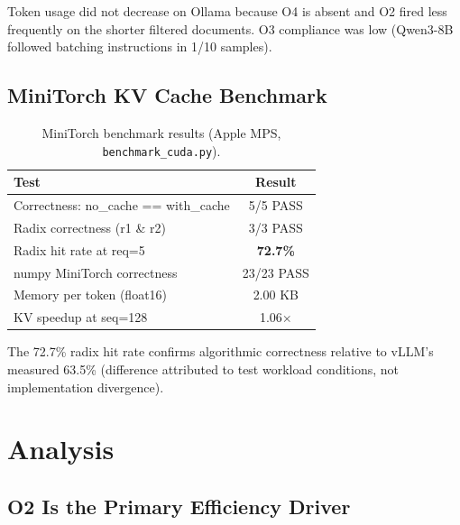 \documentclass{article}
\begin{document}
Token usage did not decrease on Ollama because O4 is absent and O2 fired less frequently on the shorter filtered documents. O3 compliance was low (Qwen3-8B followed batching instructions in 1/10 samples).

\subsection{MiniTorch KV Cache Benchmark}

\begin{table}[t]
\caption{MiniTorch benchmark results (Apple MPS, \texttt{benchmark\_cuda.py}).}
\label{tab:minitorch}
\vskip 0.1in
\begin{center}
\begin{small}
\begin{sc}
\begin{tabular}{lc}
\toprule
Test & Result \\
\midrule
Correctness: no\_cache == with\_cache & 5/5 PASS \\
Radix correctness (r1 \& r2)          & 3/3 PASS \\
Radix hit rate at req=5               & \textbf{72.7\%} \\
numpy MiniTorch correctness           & 23/23 PASS \\
Memory per token (float16)            & 2.00 KB \\
KV speedup at seq=128                 & 1.06$\times$ \\
\bottomrule
\end{tabular}
\end{sc}
\end{small}
\end{center}
\vskip -0.1in
\end{table}

The 72.7\% radix hit rate confirms algorithmic correctness relative to vLLM's measured 63.5\% (difference attributed to test workload conditions, not implementation divergence).

\section{Analysis}

\subsection{O2 Is the Primary Efficiency Driver}
\end{document}
